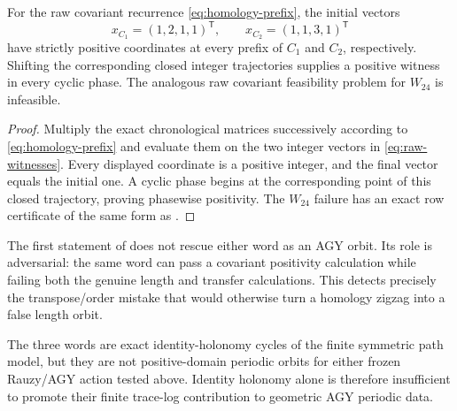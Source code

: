 \begin{proposition}
\label{prop:raw-homology}
For the raw covariant recurrence \eqref{eq:homology-prefix}, the initial
vectors
\begin{equation}
 x_{C_1}=(1,2,1,1)^{\mathsf T},\qquad
 x_{C_2}=(1,1,3,1)^{\mathsf T}
 \label{eq:raw-witnesses}
\end{equation}
have strictly positive coordinates at every prefix of $C_1$ and $C_2$,
respectively.  Shifting the corresponding closed integer trajectories
supplies a positive witness in every cyclic phase.  The analogous raw
covariant feasibility problem for $W_{24}$ is infeasible.
\end{proposition}

\begin{proof}
Multiply the exact chronological matrices successively according to
\eqref{eq:homology-prefix} and evaluate them on the two integer vectors in
\eqref{eq:raw-witnesses}.  Every displayed coordinate is a positive integer,
and the final vector equals the initial one.  A cyclic phase begins at the
corresponding point of this closed trajectory, proving phasewise positivity.
The $W_{24}$ failure has an exact row certificate of the same form as
.
\end{proof}

\begin{remark}
The first statement of  does not rescue either word as
an AGY orbit.  Its role is adversarial: the same word can pass a covariant
positivity calculation while failing both the genuine length and transfer
calculations.  This detects precisely the transpose/order mistake that would
otherwise turn a homology zigzag into a false length orbit.
\end{remark}

\begin{corollary}
\label{cor:formal-boundary}
The three words are exact identity-holonomy cycles of the finite symmetric
path model, but they are not positive-domain periodic orbits for either
frozen Rauzy/AGY action tested above.  Identity holonomy alone is therefore
insufficient to promote their finite trace-log contribution to geometric AGY
periodic data.
\end{corollary}
